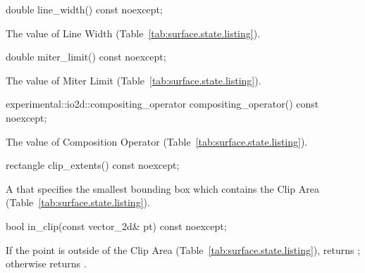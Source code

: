 \begin{itemdecl}
double line_width() const noexcept;
\end{itemdecl}
\begin{itemdescr}
\pnum
\returns
The value of Line Width (Table~\ref{tab:surface.state.listing}).
\end{itemdescr}

\begin{itemdecl}
double miter_limit() const noexcept;
\end{itemdecl}
\begin{itemdescr}
\pnum
\returns
The value of Miter Limit (Table~\ref{tab:surface.state.listing}).
\end{itemdescr}

\begin{itemdecl}
experimental::io2d::compositing_operator compositing_operator() const
  noexcept;
\end{itemdecl}
\begin{itemdescr}
\pnum
\returns
The value of Composition Operator (Table~\ref{tab:surface.state.listing}).
\end{itemdescr}

\begin{itemdecl}
rectangle clip_extents() const noexcept;
\end{itemdecl}
\begin{itemdescr}
\pnum
\returns
A  that specifies the smallest bounding box which contains the Clip Area (Table~\ref{tab:surface.state.listing}).
\end{itemdescr}

\begin{itemdecl}
bool in_clip(const vector_2d& pt) const noexcept;
\end{itemdecl}
\begin{itemdescr}
\pnum
\returns
If the point  is outside of the Clip Area (Table~\ref{tab:surface.state.listing}), returns ; otherwise returns .
\end{itemdescr}


